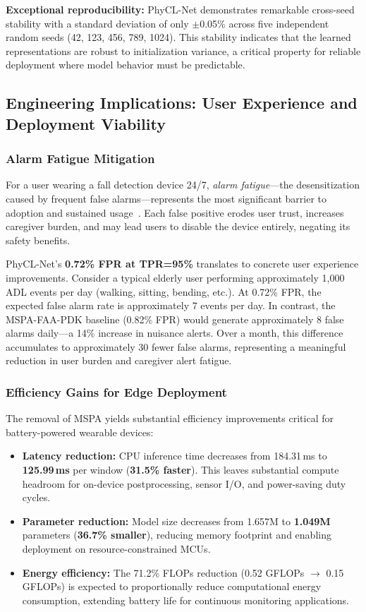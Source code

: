 \documentclass{article}
\begin{document}
\textbf{Exceptional reproducibility:} PhyCL-Net demonstrates remarkable cross-seed stability with a standard deviation of only $\pm$0.05\% across five independent random seeds (42, 123, 456, 789, 1024). This stability indicates that the learned representations are robust to initialization variance, a critical property for reliable deployment where model behavior must be predictable.

\subsection{Engineering Implications: User Experience and Deployment Viability}

\subsubsection{Alarm Fatigue Mitigation}

For a user wearing a fall detection device 24/7, \textit{alarm fatigue}---the desensitization caused by frequent false alarms---represents the most significant barrier to adoption and sustained usage~\cite{Cvach2012AlarmFatigue}. Each false positive erodes user trust, increases caregiver burden, and may lead users to disable the device entirely, negating its safety benefits.

PhyCL-Net's \textbf{0.72\% FPR at TPR=95\%} translates to concrete user experience improvements. Consider a typical elderly user performing approximately 1,000 ADL events per day (walking, sitting, bending, etc.). At 0.72\% FPR, the expected false alarm rate is approximately 7 events per day. In contrast, the MSPA-FAA-PDK baseline (0.82\% FPR) would generate approximately 8 false alarms daily---a 14\% increase in nuisance alerts. Over a month, this difference accumulates to approximately 30 fewer false alarms, representing a meaningful reduction in user burden and caregiver alert fatigue.

\subsubsection{Efficiency Gains for Edge Deployment}

The removal of MSPA yields substantial efficiency improvements critical for battery-powered wearable devices:
\begin{itemize}
    \item \textbf{Latency reduction:} CPU inference time decreases from 184.31\,ms to \textbf{125.99\,ms} per window (\textbf{31.5\% faster}). This leaves substantial compute headroom for on-device postprocessing, sensor I/O, and power-saving duty cycles.
    \item \textbf{Parameter reduction:} Model size decreases from 1.657M to \textbf{1.049M} parameters (\textbf{36.7\% smaller}), reducing memory footprint and enabling deployment on resource-constrained MCUs.
    \item \textbf{Energy efficiency:} The 71.2\% FLOPs reduction (0.52 GFLOPs $\to$ 0.15 GFLOPs) is expected to proportionally reduce computational energy consumption, extending battery life for continuous monitoring applications.
\end{itemize}
\end{document}
